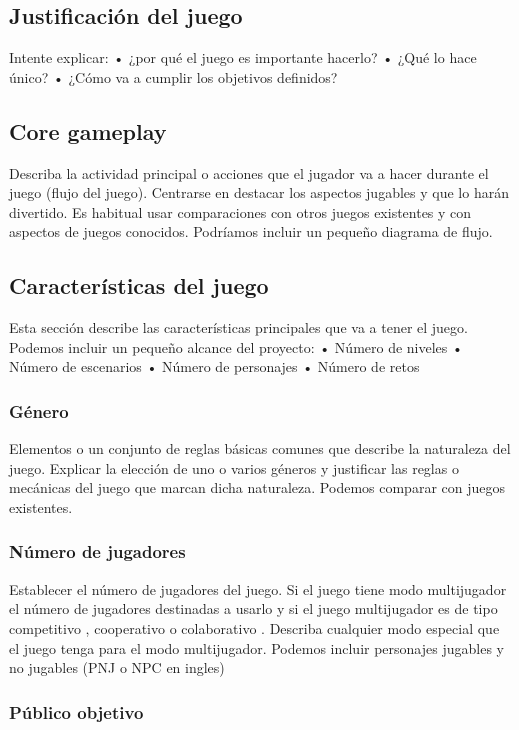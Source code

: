 \subsection{Justificación del juego}
Intente explicar: 
•	¿por qué el juego es importante hacerlo? 
•	¿Qué lo hace único? 
•	¿Cómo va a cumplir los objetivos definidos?


\subsection{Core gameplay}
Describa la actividad principal o acciones que el jugador va a hacer durante el juego (flujo del juego). Centrarse en destacar los aspectos jugables y que lo harán divertido. Es habitual usar comparaciones con otros juegos existentes y con aspectos de juegos conocidos. Podríamos incluir un pequeño diagrama de flujo.

\subsection{Características del juego}
Esta sección describe las características principales que va a tener el juego. Podemos incluir un pequeño alcance del proyecto:
•	Número de niveles
•	Número de escenarios
•	Número de personajes 
•	Número de retos

\subsubsection{Género}
Elementos o un conjunto de reglas básicas comunes que describe la naturaleza del juego. Explicar la elección de uno o varios géneros y justificar las reglas o mecánicas del juego que marcan dicha naturaleza. Podemos comparar con juegos existentes.

\subsubsection{Número de jugadores}
Establecer el número de jugadores del juego. Si el juego tiene modo multijugador el número de jugadores destinadas a usarlo y si el juego multijugador es de tipo competitivo , cooperativo o colaborativo . Describa cualquier modo especial que el juego tenga para el modo multijugador. Podemos incluir personajes jugables y no jugables (PNJ o NPC en ingles)

\subsubsection{Público objetivo}



